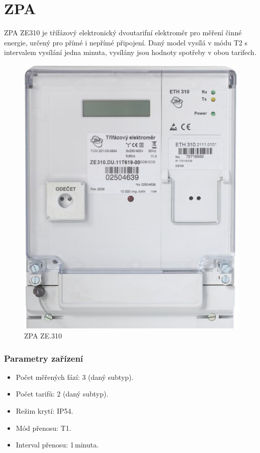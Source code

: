 	\section{ZPA}

ZPA ZE310 je třífázový elektronický dvoutarifní elektroměr pro měření činné energie, určený pro přímé i nepřímé připojení. Daný model vysílá v módu T2 s intervalem vysílání jedna minuta, vysílány jsou hodnoty spotřeby v obou tarifech.

	 \begin{figure}[!h]
  \begin{center}
    \includegraphics[scale=0.40]{obrazky/zarizeni_zpa}
  \end{center}
	\vspace{-20pt}
  \caption{ZPA ZE.310~\cite{CidloZpa}}
	\vspace{-30pt}
\end{figure}


\subsubsection{Parametry zařízení}
\begin{itemize}
	\item Počet měřených fází: 3 (daný subtyp).
	\item Počet tarifů: 2 (daný subtyp).
	\item Režim krytí: IP54.
	\item Mód přenosu: T1.
	\item Interval přenosu: 1\,minuta.
\end{itemize}

